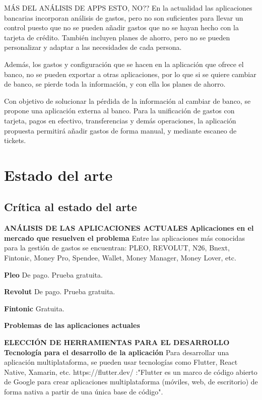 MÁS DEL ANÁLISIS DE APPS ESTO, NO??
En la actualidad las aplicaciones bancarias incorporan análisis de gastos, 
pero no son suficientes para llevar un control puesto que no se pueden 
añadir gastos que no se hayan hecho con la tarjeta de crédito. También 
incluyen planes de ahorro, pero no se pueden personalizar y adaptar a 
las necesidades de cada persona.

Además, los gastos y configuración que se hacen en la aplicación que ofrece 
el banco, no se pueden exportar a otras aplicaciones,
por lo que si se quiere cambiar de banco, se pierde toda la información, 
y con ella los planes de ahorro.

Con objetivo de solucionar la pérdida de la información al cambiar de banco, 
se propone una aplicación externa al banco. Para la unificación de gastos 
con tarjeta, pagos en efectivo, transferencias y demás operaciones, la 
aplicación propuesta permitirá añadir gastos de forma manual, y mediante 
escaneo de tickets.


\chapter{Estado del arte}
\section{Crítica al estado del arte}


\textbf{ANÁLISIS DE LAS APLICACIONES ACTUALES}
\textbf{Aplicaciones en el mercado que resuelven el problema}
Entre las aplicaciones más conocidas para la gestión de gastos se encuentran:
PLEO, REVOLUT, N26, Bnext, Fintonic, Money Pro, Spendee, Wallet, Money Manager, Money Lover, etc.

\textbf{Pleo} De pago. Prueba gratuita.

\textbf{Revolut} De pago. Prueba gratuita.

\textbf{Fintonic} Gratuita. 

\textbf{Problemas de las aplicaciones actuales}







\textbf{ELECCIÓN DE HERRAMIENTAS PARA EL DESARROLLO}
\textbf{Tecnología para el desarrollo de la aplicación}
Para desarrollar una aplicación multiplataforma, se pueden usar tecnologías como Flutter, React Native, Xamarin, etc.
https://flutter.dev/ :"Flutter es un marco de código abierto de Google para crear aplicaciones multiplataforma (móviles, 
web, de escritorio) de forma nativa a partir de una única base de código".


